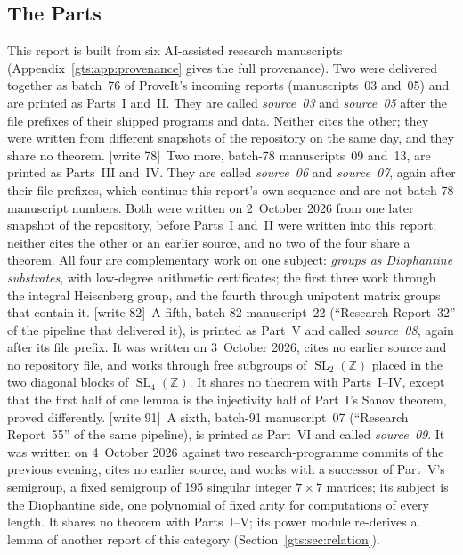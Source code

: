 \documentclass[11pt,letterpaper]{article}
\theoremstyle{definition}
\theoremstyle{remark}
\newcommand{\Z}{\mathbb Z}
\newcommand{\SL}{\operatorname{SL}}
\newcommand{\wtagb}{\textup{[write 78]}}
\newcommand{\wtagc}{\textup{[write 82]}}
\newcommand{\wtagd}{\textup{[write 91]}}
\begin{document}
\subsection{The Parts}\label{gts:sec:parts}

This report is built from six AI-assisted research manuscripts (Appendix~\ref{gts:app:provenance} gives the full provenance). Two were delivered together as batch~76 of ProveIt's incoming reports (manuscripts~03 and~05) and are printed as Parts~I and~II. They are called \emph{source~03} and \emph{source~05} after the file prefixes of their shipped programs and data. Neither cites the other; they were written from different snapshots of the repository on the same day, and they share no theorem. \wtagb\ Two more, batch-78 manuscripts~09 and~13, are printed as Parts~III and~IV. They are called \emph{source~06} and \emph{source~07}, again after their file prefixes, which continue this report's own sequence and are not batch-78 manuscript numbers. Both were written on 2~October 2026 from one later snapshot of the repository, before Parts~I and~II were written into this report; neither cites the other or an earlier source, and no two of the four share a theorem. All four are complementary work on one subject: \emph{groups as Diophantine substrates}, with low-degree arithmetic certificates; the first three work through the integral Heisenberg group, and the fourth through unipotent matrix groups that contain it. \wtagc\ A fifth, batch-82 manuscript~22 (``Research Report~32'' of the pipeline that delivered it), is printed as Part~V and called \emph{source~08}, again after its file prefix. It was written on 3~October 2026, cites no earlier source and no repository file, and works through free subgroups of $\SL_2(\Z)$ placed in the two diagonal blocks of $\SL_4(\Z)$. It shares no theorem with Parts~I--IV, except that the first half of one lemma is the injectivity half of Part~I's Sanov theorem, proved differently. \wtagd\ A sixth, batch-91 manuscript~07 (``Research Report~55'' of the same pipeline), is printed as Part~VI and called \emph{source~09}. It was written on 4~October 2026 against two research-programme commits of the previous evening, cites no earlier source, and works with a successor of Part~V's semigroup, a fixed semigroup of 195 singular integer $7\times7$ matrices; its subject is the Diophantine side, one polynomial of fixed arity for computations of every length. It shares no theorem with Parts~I--V; its power module re-derives a lemma of another report of this category (Section~\ref{gts:sec:relation}).
\end{document}
